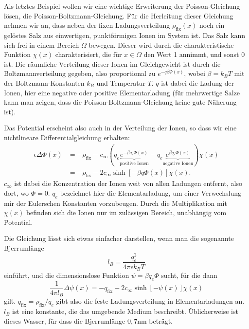 Als letztes Beispiel wollen wir eine wichtige Erweiterung der
Poisson-Gleichung lösen, die Poisson-Boltzmann-Gleichung. Für die
Herleitung dieser Gleichung nehmen wir an, dass neben der fixen
Ladungsverteilung $\rho_\text{fix}(x)$ noch ein gelöstes Salz aus
einwertigen, punktförmigen Ionen im System ist. Das Salz kann sich
frei in einem Bereich $\Omega$ bewegen. Dieser wird durch die
charakteristische Funktion $\chi(x)$ charakterisiert, die für
$x\in\Omega$ den Wert 1 annimmt, und sonst 0 ist. Die räumliche
Verteilung dieser Ionen im Gleichgewicht ist durch die
Boltzmannverteilung gegeben, also proportional zu
$e^{-q\beta\Phi(x)}$, wobei $\beta=k_BT$ mit der Boltzmann-Konstanten
$k_B$ und Temperatur $T$. $q$ ist dabei die Ladung der Ionen, hier
eine negative oder positive Elementarladung (für mehrwertige Salze
kann man zeigen, dass die Poisson-Boltzmann-Gleichung keine gute
Näherung ist).

Das Potential erscheint also auch in der Verteilung der Ionen, so dass
wir eine nichtlineare Differentialgleichung erhalten:
\begin{align}
  \epsilon\Delta \Phi(x)  &=
  -\rho_\text{fix} - c_\infty \left(q_e\underbrace{e^{-\beta
        q_e\Phi(x)}}_\text{positive Ionen} -q_e\underbrace{e^{\beta
        q_e\Phi(x)}}_\text{negative Ionen}\right)\chi(x)\nonumber\\
  &=
  -\rho_\text{fix} - 2c_\infty\sinh[-\beta q\Phi(x)]\chi(x).
\end{align}
$c_\infty$ ist dabei die Konzentration der Ionen weit von allen
Ladungen entfernt, also dort, wo $\Phi=0$. $q_e$ bezeichnet hier die
Elementarladung, um einer Verwechslung mir der Eulerschen Konstanten
vorzubeugen. Durch die Multiplikation mit $\chi(x)$ befinden sich die
Ionen nur im zulässigen Bereich, unabhängig vom Potential.

Die Gleichung lässt sich etwas einfacher darstellen, wenn man die
sogenannte Bjerrumlänge
\begin{equation}
  l_B = \frac{q_e^2}{4\pi\epsilon k_BT}
\end{equation}
einführt, und die dimensionslose Funktion $\psi=\beta q_e\Phi$ sucht,
für die dann
\begin{equation}
  \label{eq:pb}
  \frac{1}{4\pi l_B}\Delta \psi(x) =
  -q_\text{fix} - 2c_\infty\sinh[-\psi(x)]\chi(x)
\end{equation}
gilt. $q_\text{fix} = \rho_\text{fix}/q_e$ gibt also die feste
Ladungsverteilung in Elementarladungen an. $l_B$ ist eine konstante,
die das umgebende Medium beschreibt. Üblicherweise ist dieses Wasser,
für dass die Bjerrumlänge $0,7$nm beträgt.

